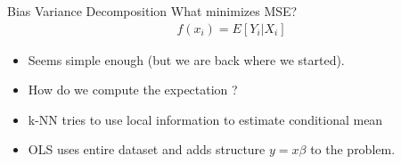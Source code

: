 \documentclass[11pt,handout,xcolor=pdftex,dvipsnames,table,mathserif,aspectratio=169]{beamer}
\begin{document}
\begin{frame}{Bias Variance Decomposition}
What minimizes MSE?
\begin{eqnarray*}
f(x_i) = E[Y_i | X_i] 
\end{eqnarray*}
\begin{itemize}
\item Seems simple enough (but we are back where we started).
\item How do we compute the expectation ?
\item k-NN tries to use local information to estimate conditional mean
\item OLS uses entire dataset and adds structure $ y = x \beta$ to the problem.
\end{itemize}
\end{frame}
\end{document}
